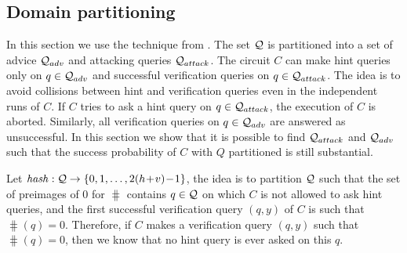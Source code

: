 %
\subsection{Domain partitioning}
\label{st:domain_partition}
In this section we use the technique from \cite{dodis2009security}.
The set $\mathcal{Q}$ is partitioned into a set of advice $\mathcal{Q}_{adv}$ and attacking queries $\mathcal{Q}_{attack}$.
The circuit $C$ can make hint queries only on $q \in \mathcal{Q}_{adv}$ and successful verification queries on $q \in \mathcal{Q}_{attack}$.
The idea is to avoid collisions between hint and verification queries even in the independent runs of $C$.
If $C$ tries to ask a hint query on $q \in \mathcal{Q}_{attack}$, the execution of $C$ is aborted.
Similarly, all verification queries on $q \in \mathcal{Q}_{adv}$ are answered as unsuccessful.
In this section we show that it is possible to find $\mathcal{Q}_{attack}$ and $\mathcal{Q}_{adv}$ such that
the success probability of $C$ with $Q$ partitioned is still substantial.

Let $\operatorname{\mathit{hash}}:\mathcal{Q}\rightarrow\{0,1,\dots, 2(h\!+\!v)\!-\!1\}$, the idea is to partition $\mathcal{Q}$ such that the set of preimages
of $0$ for $\hash$ contains $q \in \mathcal{Q}$ on which $C$ is not allowed to ask hint queries,
and the first successful verification query $(q,y)$ of $C$ is such that $\hash(q) = 0$.
Therefore, if $C$ makes a verification query $(q,y)$ such that $\hash(q) = 0$, then we know that no hint query is ever asked on this $q$.

